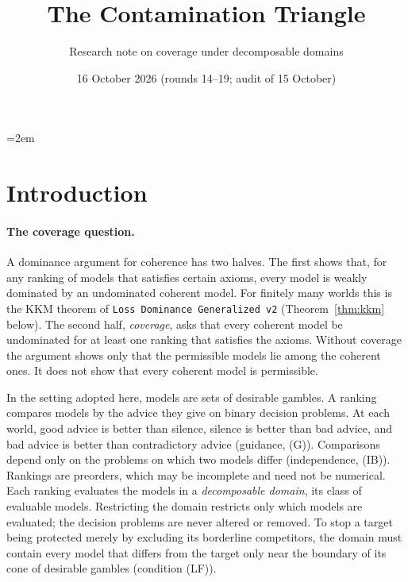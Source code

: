 \documentclass[11pt]{article}
\title{The Contamination Triangle}
\author{Research note on coverage under decomposable domains}
\date{16 October 2026 (rounds 14--19; audit of 15 October)}
\theoremstyle{definition}
\theoremstyle{remark}
\newcommand{\src}[1]{\texttt{#1}}
\begin{document}
\emergencystretch=2em
\maketitle

\section{Introduction}\label{sec:intro}

\paragraph{The coverage question.}
A dominance argument for coherence has two halves. The first shows that, for any ranking of models that satisfies certain axioms, every model is weakly dominated by an undominated coherent model. For finitely many worlds this is the KKM theorem of \src{Loss Dominance Generalized v2} (Theorem~\ref{thm:kkm} below). The second half, \emph{coverage}, asks that every coherent model be undominated for at least one ranking that satisfies the axioms. Without coverage the argument shows only that the permissible models lie among the coherent ones. It does not show that every coherent model is permissible.

In the setting adopted here, models are sets of desirable gambles. A ranking compares models by the advice they give on binary decision problems. At each world, good advice is better than silence, silence is better than bad advice, and bad advice is better than contradictory advice (guidance, (G)). Comparisons depend only on the problems on which two models differ (independence, (IB)). Rankings are preorders, which may be incomplete and need not be numerical. Each ranking evaluates the models in a \emph{decomposable domain}, its class of evaluable models. Restricting the domain restricts only which models are evaluated; the decision problems are never altered or removed. To stop a target being protected merely by excluding its borderline competitors, the domain must contain every model that differs from the target only near the boundary of its cone of desirable gambles (condition (LF)).
\end{document}
